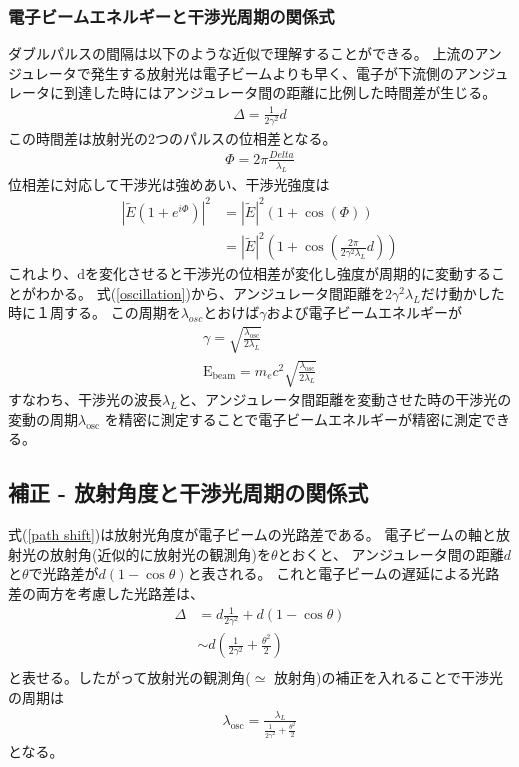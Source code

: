 \documentclass[a4paper,11pt,uplatex]{jsarticle}
\begin{document}
\subsubsection{電子ビームエネルギーと干渉光周期の関係式}
ダブルパルスの間隔は以下のような近似で理解することができる。
上流のアンジュレータで発生する放射光は電子ビームよりも早く、電子が下流側のアンジュレータに到達した時にはアンジュレータ間の距離に比例した時間差が生じる。
\begin{eqnarray}
  \Delta = \frac{1}{2\gamma^2}d \label{path shift}
\end{eqnarray}
この時間差は放射光の2つのパルスの位相差となる。
\begin{eqnarray}
  \Phi = 2\pi \frac{Delta}{\lambda_L}
\end{eqnarray}
位相差に対応して干渉光は強めあい、干渉光強度は
\begin{eqnarray}
  |\tilde{E} \left( 1+ e^{i\Phi}\right)|^2 
&= |\tilde{E}|^2 \left( 1 + \cos(\Phi) \right)\\
&= |\tilde{E}|^2 \left( 1 + \cos(\frac{2\pi}{2\gamma^2\lambda_L}d) \right) 
  \label{oscillation}
\end{eqnarray}
これより、dを変化させると干渉光の位相差が変化し強度が周期的に変動することがわかる。
式(\ref{oscillation})から、アンジュレータ間距離を$2\gamma^2\lambda_L$だけ動かした時に１周する。
この周期を$\lambda_{osc}$とおけば$\gamma$および電子ビームエネルギーが
\begin{eqnarray}
  \gamma = \sqrt{\frac{\lambda_{\text{osc}}}{2\lambda_L}}\\
  \text{E}_\text{beam} =m_e c^2  \sqrt{\frac{\lambda_{\text{osc}}}{2\lambda_L}} 
\end{eqnarray}
すなわち、干渉光の波長$\lambda_L$と、アンジュレータ間距離を変動させた時の干渉光の変動の周期$\lambda_{\text{osc}}$
を精密に測定することで電子ビームエネルギーが精密に測定できる。
\subsection{補正 - 放射角度と干渉光周期の関係式}
式(\ref*{path shift})は放射光角度が電子ビームの光路差である。
電子ビームの軸と放射光の放射角(近似的に放射光の観測角)を$\theta$とおくと、
アンジュレータ間の距離$d$と$\theta$で光路差が$d(1-\cos{\theta})$と表される。
これと電子ビームの遅延による光路差の両方を考慮した光路差は、
\begin{eqnarray}
  \Delta &= d\frac{1}{2\gamma^2} + d(1 - \cos{\theta}) \\
        &\sim d(\frac{1}{2\gamma^2} + \frac{\theta^2}{2})\\
\end{eqnarray}
と表せる。したがって放射光の観測角($\simeq$ 放射角)の補正を入れることで干渉光の周期は
\begin{eqnarray}
  \lambda_{\text{osc}} = \frac{\lambda_L}{\frac{1}{2\gamma^2} + \frac{\theta^2}{2}}
\end{eqnarray}
となる。
\end{document}
